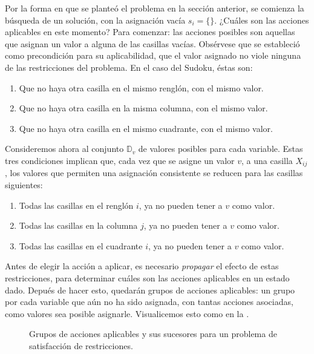 Por la forma en que se planteó el problema en la sección anterior, se comienza la búsqueda de un solución, con la asignación vacía $s_i = \{\}$.  ¿Cuáles son las acciones aplicables en este momento?  Para comenzar: las acciones posibles son aquellas que asignan un valor a alguna de las casillas vacías.  Obsérvese que se estableció como precondición para su aplicabilidad, que el valor asignado no viole ninguna de las restricciones del problema.  En el caso del Sudoku, éstas son:
\begin{enumerate}
 \item Que no haya otra casilla en el mismo renglón, con el mismo valor.
 \item Que no haya otra casilla en la misma columna, con el mismo valor.
 \item Que no haya otra casilla en el mismo cuadrante, con el mismo valor.
\end{enumerate}

Consideremos ahora al conjunto $\mathbb{D}_v$ de valores posibles para cada variable.
Estas tres condiciones implican que, cada vez que se asigne un valor $v$, a una casilla $X_{ij}$, los valores que permiten una asignación consistente se reducen para las casillas siguientes:
\begin{enumerate}
 \item Todas las casillas en el renglón $i$, ya no pueden tener a $v$ como valor.
 \item Todas las casillas en la columna $j$, ya no pueden tener a $v$ como valor.
 \item Todas las casillas en el cuadrante $i$, ya no pueden tener a $v$ como valor.
\end{enumerate}

Antes de elegir la acción a aplicar, es necesario \emph{propagar} el efecto de estas restricciones, para determinar cuáles son las acciones aplicables en un estado dado.  Depués de hacer esto, quedarán grupos de acciones aplicables: un grupo por cada variable que aún no ha sido asignada, con tantas acciones asociadas, como valores sea posible asignarle.  Visualicemos esto como en la .

\begin{figure}
 \centering
 \caption{Grupos de acciones aplicables y sus sucesores para un problema de satisfacción de restricciones.}\label{fig:sucesores_restricciones}
\end{figure}

